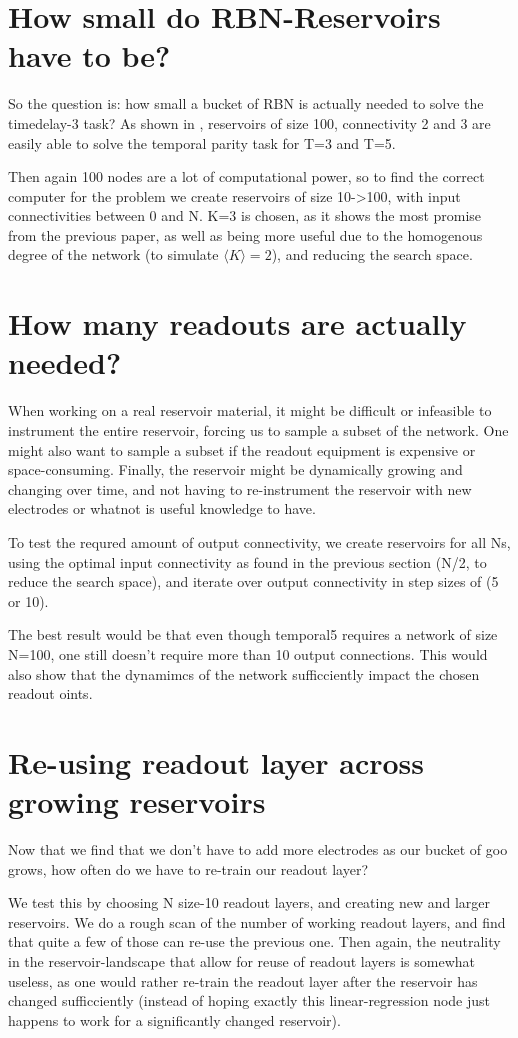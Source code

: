 \section{How small do RBN-Reservoirs have to be?}

So the question is: how small a bucket of RBN is actually needed to solve the timedelay-3 task?
As shown in \cite{MyPreviousPaper}, reservoirs of size 100, connectivity 2 and 3 are easily able to solve the temporal parity task for T=3 and T=5.

Then again 100 nodes are a lot of computational power,
so to find the correct computer for the problem we create reservoirs of size 10->100,
with input connectivities between 0 and N.
K=3 is chosen, as it shows the most promise from the previous paper,
as well as being more useful due to the homogenous degree of the network (to simulate $\langle K \rangle = 2 $),
and reducing the search space.

\section{How many readouts are actually needed?}

When working on a real reservoir material, it might be difficult or infeasible to instrument the entire reservoir, forcing us to sample a subset of the network.
One might also want to sample a subset if the readout equipment is expensive or space-consuming.
Finally, the reservoir might be dynamically growing and changing over time,
and not having to re-instrument the reservoir with new electrodes or whatnot is useful knowledge to have.

To test the requred amount of output connectivity,
we create reservoirs for all Ns, using the optimal input connectivity as found in the previous section (N/2, to reduce the search space), and iterate over output connectivity in step sizes of (5 or 10).

The best result would be that even though temporal5 requires a network of size N=100,
one still doesn't require more than 10 output connections.
This would also show that the dynamimcs of the network sufficciently impact the chosen readout oints.

\section{Re-using readout layer across growing reservoirs}

Now that we find that we don't have to add more electrodes as our bucket of goo grows,
how often do we have to re-train our readout layer?

We test this by choosing N size-10 readout layers, and creating new and larger reservoirs.
We do a rough scan of the number of working readout layers, and find that quite a few of those can re-use the previous one.
Then again, the neutrality in the reservoir-landscape that allow for reuse of readout layers is somewhat useless, as one would rather re-train the readout layer after the reservoir has changed sufficciently (instead of hoping exactly this linear-regression node just happens to work for a significantly changed reservoir).
